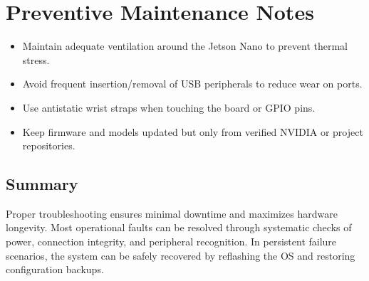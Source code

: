 \section{Preventive Maintenance Notes}

\begin{itemize}
	\item Maintain adequate ventilation around the Jetson Nano to prevent thermal stress.
	\item Avoid frequent insertion/removal of USB peripherals to reduce wear on ports.
	\item Use antistatic wrist straps when touching the board or GPIO pins.
	\item Keep firmware and models updated but only from verified NVIDIA or project repositories.
\end{itemize}

\subsection*{Summary}

Proper troubleshooting ensures minimal downtime and maximizes hardware longevity.  
Most operational faults can be resolved through systematic checks of power, connection integrity, and peripheral recognition.  
In persistent failure scenarios, the system can be safely recovered by reflashing the OS and restoring configuration backups.